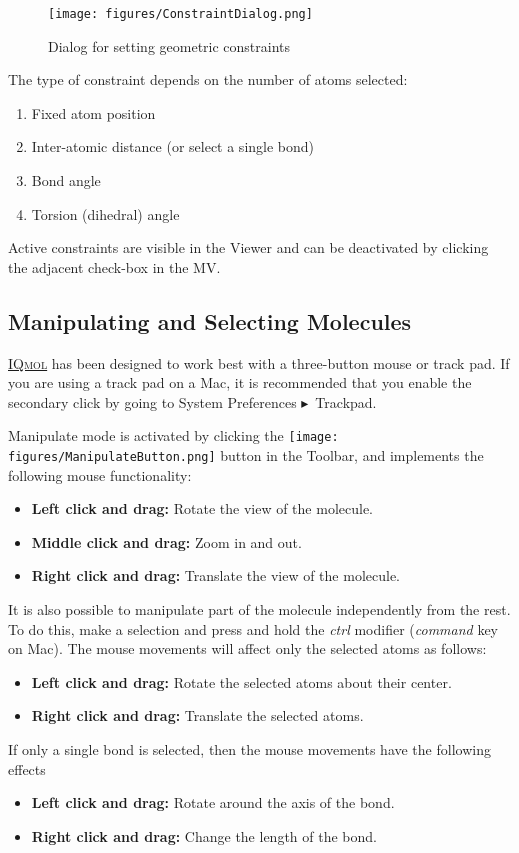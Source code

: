 \documentclass[a4paper,12pt]{article}
\newcommand{\iqmol}{\href{http://iqmol.org}{{\scshape IQmol}}}
\newcommand{\bt}{\ensuremath{\blacktriangleright}}
\begin{document}
\begin{figure}[h]
\begin{center}
\texttt{[image: figures/ConstraintDialog.png]}
\caption{Dialog for setting geometric constraints}
\end{center}
\end{figure}

The type of constraint depends on the number of atoms selected:
\vspace{-1em}
\begin{enumerate}
\itemsep0em
\item Fixed atom position
\item Inter-atomic distance (or select a single bond)
\item Bond angle
\item Torsion (dihedral) angle
\end{enumerate}
Active constraints are visible in the Viewer and can be deactivated by clicking
the adjacent check-box in the MV.


\subsection{Manipulating and Selecting Molecules}
\label{sec:mousemodes}

\iqmol{} has been designed to work best with a three-button mouse or track pad.
If you are using a track pad on a  Mac, it is recommended that you enable the
secondary click by going to System Preferences \bt\ Trackpad.

Manipulate mode is activated by clicking the
\texttt{[image: figures/ManipulateButton.png]} button in the
Toolbar, and implements the following mouse functionality:
\begin{itemize}
\item {\bf Left click and drag:} Rotate the view of the molecule.  
\item {\bf Middle click and drag:} Zoom in and out.  
\item {\bf Right click and drag:} Translate the view of the molecule.
\end{itemize}

It is also possible to manipulate part of the molecule independently from the
rest.  To do this, make a selection and press and hold the \emph{ctrl} modifier
(\emph{command} key on Mac).  The mouse movements will affect only the 
selected atoms as follows:
\begin{itemize}
\item {\bf Left click and drag:} Rotate the selected atoms about their center. 
\item {\bf Right click and drag:} Translate the selected atoms.  
\end{itemize}
If only a single bond is selected, then the mouse movements have the following effects
\begin{itemize}
\item {\bf Left click and drag:} Rotate around the axis of the bond.
\item {\bf Right click and drag:} Change the length of the bond.
\end{itemize}
\end{document}
